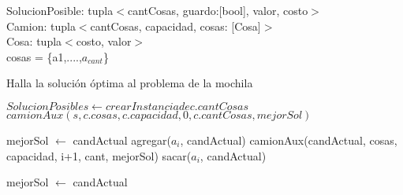 \noindent
SolucionPosible: tupla$<$cantCosas, guardo:[bool], valor, costo$>$ \\
Camion: tupla$<$cantCosas, capacidad, cosas: [Cosa]$>$ \\
Cosa: tupla$<$costo, valor$>$ \\
cosas = \{a1,....,$a_{cant}$\} \\

\begin{algorithm}
\caption{Halla la solución óptima al problema de la mochila}
\begin{algorithmic}[1]
    \STATE $SolucionPosible s \leftarrow crear Instancia de c.cantCosas$
    \STATE $camionAux(s, c.cosas, c.capacidad, 0, c.cantCosas, mejorSol)$
\end{algorithmic}
\end{algorithm}

\medskip
\begin{algorithm}
\begin{algorithmic}[1]
        \STATE mejorSol $\leftarrow$ candActual
    \ELSE
                    \STATE agregar($a_i$, candActual)
                    \STATE camionAux(candActual, cosas, capacidad, i+1, cant, mejorSol)
                    \STATE sacar($a_i$, candActual)
                \ENDIF
            \ENDFOR

                \STATE mejorSol $\leftarrow$ candActual
            \ENDIF
        \ENDIF
    \ENDIF
\end{algorithmic}
\end{algorithm}
